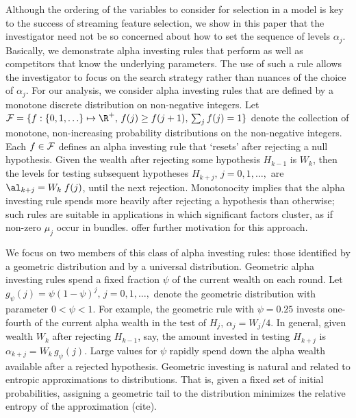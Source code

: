 \documentclass[12pt]{article}
\begin{document}
 
 Although the ordering of the variables to consider for selection in a model is
 key to the success of streaming feature selection, we show in this paper that
 the investigator need not be so concerned about how to set the sequence of
 levels $\alpha_j$.  Basically, we demonstrate alpha investing rules that
 perform as well as competitors that know the underlying parameters.  The use of
 such a rule allows the investigator to focus on the search strategy rather than
 nuances of the choice of $\alpha_j$.  For our analysis, we consider alpha
 investing rules that are defined by a monotone discrete distribution on
 non-negative integers.  Let ${\cal F} = \{f:\{0,1,\ldots\} \mapsto \R^{+}, \, f(j)
 \ge f(j+1),\, \sum_j f(j) = 1\}$ denote the collection of monotone,
 non-increasing probability distributions on the non-negative integers.  Each $f
 \in {\cal F}$ defines an alpha investing rule that `resets' after rejecting a
 null hypothesis.  Given the wealth after rejecting some hypothesis $H_{k-1}$ is
 $W_{k}$, then the levels for testing subsequent hypotheses $H_{k+j}, \,
 j=0,1,\ldots,$ are $\al_{k+j} = W_k \; f(j)$, until the next rejection.
  Monotonocity implies that the alpha investing rule spends more heavily after
 rejecting a hypothesis than otherwise; such rules are suitable in applications
 in which significant factors cluster, as if non-zero $\mu_j$ occur in bundles.
  \citet{fosterstine08} offer further motivation for this approach.

 
 We focus on two members of this class of alpha investing rules: those
 identified by a geometric distribution and by a universal distribution.
  Geometric alpha investing rules spend a fixed fraction $\psi$ of the current
 wealth on each round.  Let $g_\psi(j) = \psi(1-\psi)^{j},\, j=0,1,\ldots,$
 denote the geometric distribution with parameter $0 < \psi <
 1$.   For example, the geometric rule with $\psi =
 0.25$ invests one-fourth of the current alpha wealth in the test of $H_j$,
 $\alpha_j = W_j/4$.  In general, given wealth $W_{k}$ after rejecting
 $H_{k-1}$, say, the amount invested in testing $H_{k+j}$ is $\alpha_{k+j} = W_k
 \, g_\psi(j)$.  Large values for $\psi$ rapidly spend down the alpha wealth
 available after a rejected hypothesis.  Geometric investing is natural and
 related to entropic approximations to distributions.  That is, given a fixed
 set of initial probabilities, assigning a geometric tail to the distribution
 minimizes the relative entropy of the approximation (cite).
\end{document}
